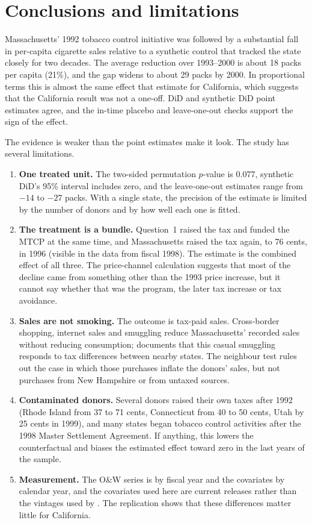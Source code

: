 \documentclass[11pt]{article}
\begin{document}
\section{Conclusions and limitations}

Massachusetts' 1992 tobacco control initiative was followed by a substantial
fall in per-capita cigarette sales relative to a synthetic control that tracked
the state closely for two decades. The average reduction over 1993--2000 is
about 18 packs per capita (21\%), and the gap widens to about 29 packs by 2000.
In proportional terms this is almost the same effect that \citet{adh2010}
estimate for California, which suggests that the California result was not a
one-off. DiD and synthetic DiD point estimates agree, and the in-time placebo
and leave-one-out checks support the sign of the effect.

The evidence is weaker than the point estimates make it look. The study has
several limitations.

\begin{enumerate}
\item \textbf{One treated unit.} The two-sided permutation $p$-value is 0.077,
synthetic DiD's 95\% interval includes zero, and the leave-one-out estimates
range from $-14$ to $-27$ packs. With a single state, the precision of the
estimate is limited by the number of donors and by how well each one is
fitted.
\item \textbf{The treatment is a bundle.} Question~1 raised the tax and funded
the MTCP at the same time, and Massachusetts raised the tax again, to 76 cents,
in 1996 (visible in the data from fiscal 1998). The estimate is the combined
effect of all three. The price-channel calculation suggests that most of the
decline came from something other than the 1993 price increase, but it cannot
say whether that was the program, the later tax increase or tax avoidance.
\item \textbf{Sales are not smoking.} The outcome is tax-paid sales.
Cross-border shopping, internet sales and smuggling reduce Massachusetts' recorded
sales without reducing consumption; \citet{lovenheim2008} documents that this
casual smuggling responds to tax differences between nearby states. The
neighbour test rules out the case in which those purchases inflate the donors'
sales, but not purchases from New Hampshire or from untaxed sources.
\item \textbf{Contaminated donors.} Several donors raised their own taxes after
1992 (Rhode Island from 37 to 71 cents, Connecticut from 40 to 50 cents, Utah by
25 cents in 1999), and many states began tobacco control activities after the
1998 Master Settlement Agreement. If anything, this lowers the counterfactual
and biases the estimated effect toward zero in the last years of the sample.
\item \textbf{Measurement.} The O\&W series is by fiscal year and the
covariates by calendar year, and the covariates used here are current releases
rather than the vintages used by \citet{adh2010}. The replication shows that
these differences matter little for California.
\end{enumerate}
\end{document}
